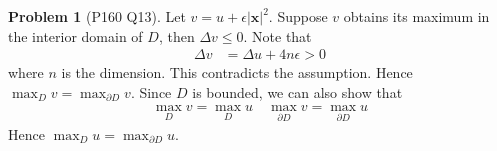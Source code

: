 \documentclass[twoside,11pt]{article}
\theoremstyle{definition}
\newtheorem{problem}{Problem}
\theoremstyle{remark}
\begin{document}
\begin{problem}[P160 Q13]
Let $v=u+\epsilon|\mathbf{x}|^2$.
Suppose $v$ obtains its maximum in the interior domain of $D$, then
$\Delta v \leq 0$.
Note that
\begin{align*}
    \Delta v &= \Delta u + 4n\epsilon > 0
\end{align*}
where $n$ is the dimension.
This contradicts the assumption.
Hence $\max_D v = \max_{\partial D} v$.
Since $D$ is bounded, we can also show that
\begin{align*}
    \max_D v = \max_D u\quad
    \max_{\partial D} v = \max_{\partial D} u
\end{align*}
Hence $\max_{D} u = \max_{\partial D} u$.


\end{problem}




\end{document}

